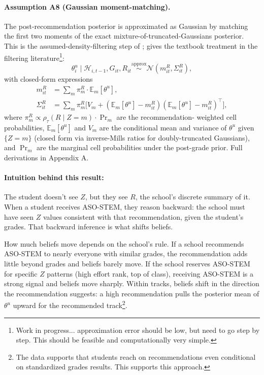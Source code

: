 \documentclass{article}
\begin{document}
\paragraph{Assumption A8 (Gaussian moment-matching).} The post-recommendation
posterior is approximated as Gaussian by matching the first two moments of
the exact mixture-of-truncated-Gaussians posterior. This is the assumed-density-filtering step of \citet{minka2001expectation}; \citet{sarkka2013bayesian} gives the textbook treatment in the filtering literature\footnote{Work in progress... approximation error should be low, but need to go step by step. This should be feasible and computationally very simple.}:
\begin{equation}
  \theta^u_i \mid \mathcal{H}_{i,t-1}, G_{it}, R_{it} 
  \stackrel{\mathrm{approx}}{\sim} \mathcal{N}(m^R_{it}, \Sigma^R_{it}),
\end{equation}
with closed-form expressions
\begin{align}
  m^R_{it} &= \sum_{m} \pi^R_m \cdot \mathbb{E}_m[\theta^u], \\
  \Sigma^R_{it} &= \sum_m \pi^R_m \big[V_m + (\mathbb{E}_m[\theta^u] - m^R_{it})
                                           (\mathbb{E}_m[\theta^u] - m^R_{it})^\top\big],
\end{align}
where $\pi^R_m \propto \rho_\tau(R \mid Z=m) \cdot \Pr_m$ are the recommendation-
weighted cell probabilities, $\mathbb{E}_m[\theta^u]$ and $V_m$ are the conditional 
mean and variance of $\theta^u$ given $\{Z = m\}$ (closed form via inverse-Mills 
ratios for doubly-truncated Gaussians), and $\Pr_m$ are the marginal cell 
probabilities under the post-grade prior. Full derivations in Appendix A.

\paragraph{Intuition behind this result:} The student doesn't see $Z$, but they see $R$, the school's discrete summary of it. When a student receives ASO-STEM, they reason 
backward: the school must have seen $Z$ values consistent with that recommendation, 
given the student's grades. That backward inference is what shifts beliefs.

How much beliefs move depends on the school's rule. If a school recommends 
ASO-STEM to nearly everyone with similar grades, the recommendation adds little 
beyond grades and beliefs barely move. If the school reserves ASO-STEM for 
specific $Z$ patterns (high effort rank, top of class), receiving ASO-STEM is a 
strong signal and beliefs move sharply. Within tracks, beliefs shift in the 
direction the recommendation suggests: a high recommendation pulls the posterior 
mean of $\theta^u$ upward for the recommended track\footnote{The data supports that students reach on recommendations even conditional on standardized grades results. This supports this approach.}.
\end{document}
